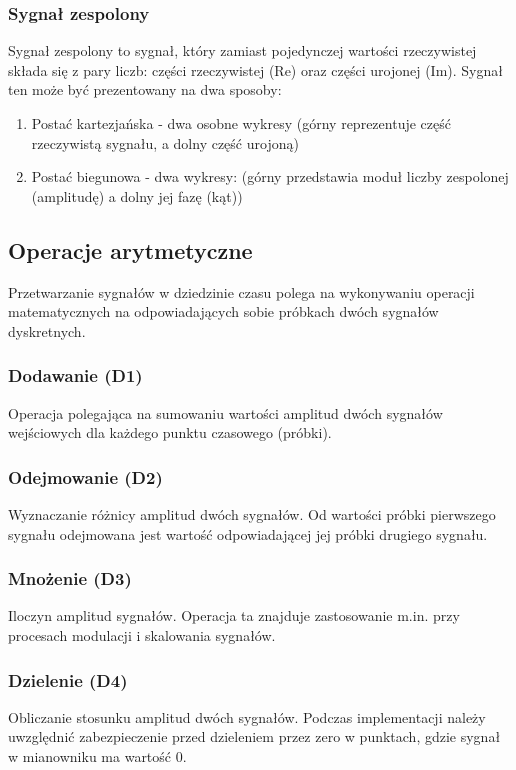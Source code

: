 \documentclass[12pt]{article}
\begin{document}
\subsubsection*{Sygnał zespolony}
Sygnał zespolony to sygnał, który zamiast pojedynczej wartości rzeczywistej składa się z pary liczb: części rzeczywistej (Re) oraz części urojonej (Im). Sygnał ten może być prezentowany na dwa sposoby:\\
\begin{enumerate}
    \item Postać kartezjańska - dwa osobne wykresy (górny reprezentuje część rzeczywistą sygnału, a dolny część urojoną)
    \item Postać biegunowa - dwa wykresy: (górny przedstawia moduł liczby zespolonej (amplitudę) a dolny jej fazę (kąt))
\end{enumerate}

\subsection{Operacje arytmetyczne}
Przetwarzanie sygnałów w dziedzinie czasu polega na wykonywaniu operacji matematycznych na odpowiadających sobie próbkach dwóch sygnałów dyskretnych.

\subsubsection{Dodawanie (D1)}
Operacja polegająca na sumowaniu wartości amplitud dwóch sygnałów wejściowych dla każdego punktu czasowego (próbki).

\subsubsection{Odejmowanie (D2)}
Wyznaczanie różnicy amplitud dwóch sygnałów. Od wartości próbki pierwszego sygnału odejmowana jest wartość odpowiadającej jej próbki drugiego sygnału.

\subsubsection{Mnożenie (D3)}
Iloczyn amplitud sygnałów. Operacja ta znajduje zastosowanie m.in. przy procesach modulacji i skalowania sygnałów.

\subsubsection{Dzielenie (D4)}
Obliczanie stosunku amplitud dwóch sygnałów. Podczas implementacji należy uwzględnić zabezpieczenie przed dzieleniem przez zero w punktach, gdzie sygnał w mianowniku ma wartość 0.
\end{document}
